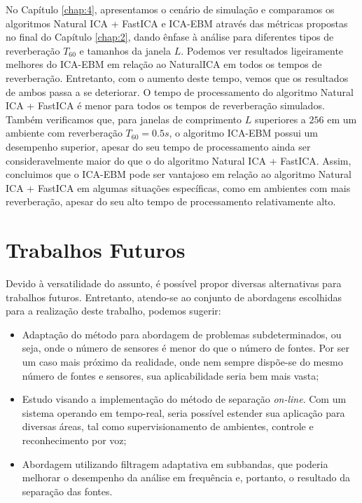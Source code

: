 No Capítulo \ref{chap:4}, apresentamos o cenário de simulação e comparamos os algoritmos Natural ICA + FastICA e ICA-EBM através das métricas propostas no final do Capítulo \ref{chap:2}, dando ênfase à análise para diferentes tipos de reverberação $T_{60}$ e tamanhos da janela $L$. Podemos ver resultados ligeiramente melhores do ICA-EBM em relação ao NaturalICA em todos os tempos de reverberação. Entretanto, com o aumento deste tempo, vemos que os resultados de ambos passa a se deteriorar. O tempo de processamento do algoritmo Natural ICA + FastICA é menor para todos os tempos de reverberação simulados. Também verificamos que, para janelas de comprimento $L$ superiores a $256$ em um ambiente com reverberação $T_{60}=0.5s$, o algoritmo ICA-EBM possui um desempenho superior, apesar do seu tempo de processamento ainda ser consideravelmente maior do que o do algoritmo Natural ICA + FastICA. Assim, concluimos que o ICA-EBM pode ser vantajoso em relação ao algoritmo Natural ICA + FastICA em algumas situações específicas, como em ambientes com mais reverberação, apesar do seu alto tempo de processamento relativamente alto.

\section{Trabalhos Futuros}

Devido à versatilidade do assunto, é possível propor diversas alternativas para trabalhos futuros. Entretanto, atendo-se ao conjunto de abordagens escolhidas para a realização deste trabalho, podemos sugerir:
\begin{itemize}
    \item Adaptação do método para abordagem de problemas subdeterminados, ou seja, onde o número de sensores é menor do que o número de fontes. Por ser um caso mais próximo da realidade, onde nem sempre dispõe-se do mesmo número de fontes e sensores, sua aplicabilidade seria bem mais vasta;
    
    \item Estudo visando a implementação do método de separação \textit{on-line}. Com um sistema operando em tempo-real, seria possível estender sua aplicação para diversas áreas, tal como supervisionamento de ambientes, controle e reconhecimento por voz;
    
    \item Abordagem utilizando filtragem adaptativa em subbandas, que poderia melhorar o desempenho da análise em frequência e, portanto, o resultado da separação das fontes.
\end{itemize}